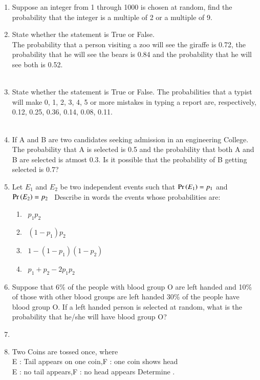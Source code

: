 \begin{enumerate}[label=\thesection.\arabic*,ref=\thesection.\theenumi]
\item Suppose an integer from 1 through 1000 is chosen at random, find the probability that the integer is a multiple of 2 or a multiple of 9.
%
\item State whether the statement is True or False.\\
The probability that a person visiting a zoo will see the giraffe is 0.72, the probability that he will see the bears is 0.84 and the probability that he will see both is 0.52.\\
\solution
\\
%
\item State whether the statement is True or False. The probabilities that a typist will make 0, 1, 2, 3, 4, 5 or more mistakes in typing a report are, respectively, 0.12, 0.25, 0.36, 0.14, 0.08, 0.11.\\
\solution
\\
%
\item If A and B are two candidates seeking admission in an engineering College. The probability that A is selected is 0.5 and the probability that both A and B are selected is atmost 0.3. Is it possible that the probability of B getting selected is 0.7?\\
%
\item Let $E_1$ and $E_2$ be two independent events such that $\Pr\left(E_1\right) = p_1 $ and $ \Pr\left(E_2\right) = p_2 $ \ Describe in words the events whose probabilities are: 
\begin{enumerate}
\item \ $p_1 p_2$
\quad\item \ $(1 - p_1) p_2 $
\quad\item \ $1 - (1 - p_1)(1 - p_2)$
\quad\item \ $p_1 + p_2 - 2p_1 p_2$
\end{enumerate}
%
\item Suppose that 6\% of the people with blood group O are left handed and 10\% of those with other blood groups are left handed 30\% of the people have blood group O. If a left handed person is selected at random, what is the probability that he/she will have blood group O?
%
\item %
\item Two Coins are tossed once, where\\
 E : Tail appears on one coin,\qquad F : one coin shows head\\
  E : no tail appears,\qquad\qquad\qquad F : no head appears
Determine .
%
\end{enumerate}
